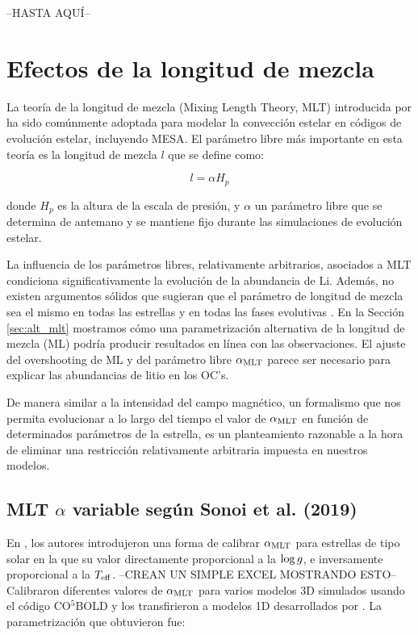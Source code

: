 --HASTA AQUÍ--

\section{Efectos de la longitud de mezcla}
La teoría de la longitud de mezcla (Mixing Length Theory, MLT) introducida por \citet{BohmVit58} ha sido comúnmente adoptada para modelar la convección estelar en códigos de evolución estelar, incluyendo MESA. El parámetro libre más importante en esta teoría es la longitud de mezcla $l$ que se define como:

\begin{equation}
	l = \alpha H_p\label{eq:mixlength}
\end{equation}

donde $H_p$ es la altura de la escala de presión, y $\alpha$ un parámetro libre que se determina de antemano y se mantiene fijo durante las simulaciones de evolución estelar. \par

La influencia de los parámetros libres, relativamente arbitrarios, asociados a MLT condiciona significativamente la evolución de la abundancia de Li. Además, no existen argumentos sólidos que sugieran que el parámetro de longitud de mezcla sea el mismo en todas las estrellas y en todas las fases evolutivas \cite{Pasetto2014}. En la Sección \ref{sec:alt_mlt} mostramos cómo una parametrización alternativa de la longitud de mezcla (ML) podría producir resultados en línea con las observaciones. El ajuste del overshooting de ML y del parámetro libre $\alpha_{\mathrm{MLT}}$ parece ser necesario para explicar las abundancias de litio en los OC's.\par

De manera similar a la intensidad del campo magnético, un formalismo que nos permita evolucionar a lo largo del tiempo el valor de $\alpha_{\mathrm{MLT}}$ en función de determinados parámetros de la estrella, es un planteamiento razonable a la hora de eliminar una restricción relativamente arbitraria impuesta en nuestros modelos.

\subsection{MLT $\alpha$ variable según Sonoi et al. (2019)}
En \cite{Sonoi2018}, los autores introdujeron una forma de calibrar $\alpha_{\mathrm{MLT}}$ para estrellas de tipo solar en la que su valor directamente proporcional a la $\mathrm{log} \, g$, e inversamente proporcional a la $T_{\mathrm{eff}}$. --CREAN UN SIMPLE EXCEL MOSTRANDO ESTO-- Calibraron diferentes valores de $\alpha_{\mathrm{MLT}}$ para varios modelos 3D simulados usando el código CO$^5$BOLD \citep{Freytag2011} y los transfirieron a modelos 1D desarrollados por \cite{Ludwig1998}. La parametrización que obtuvieron fue: 

